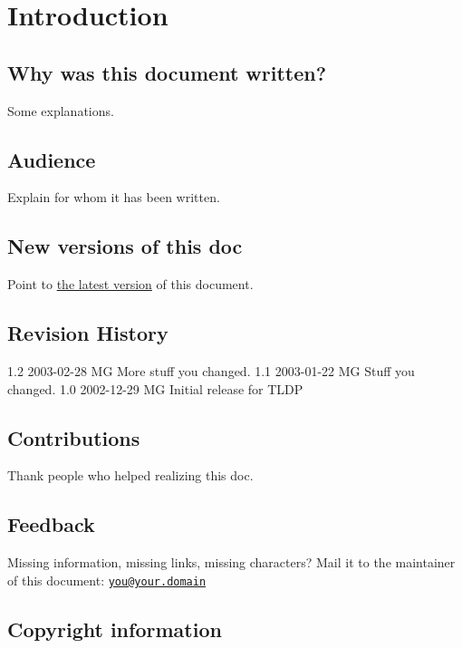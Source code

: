 \section{Introduction}

\subsection{Why was this document written?}\label{introux5f01}

Some explanations.

\subsection{Audience}\label{introux5f02}

Explain for whom it has been written.

\subsection{New versions of this doc}\label{introux5f03}

Point to \href{http://somewhere.org}{the latest version} of this
document.

\subsection{Revision History}\label{introux5f04}

1.2 2003-02-28 MG More stuff you changed. 1.1 2003-01-22 MG Stuff you
changed. 1.0 2002-12-29 MG Initial release for TLDP

\subsection{Contributions}\label{introux5f05}

Thank people who helped realizing this doc.

\subsection{Feedback}\label{introux5f06}

Missing information, missing links, missing characters? Mail it to the
maintainer of this document:
\href{mailto:you@your.domain}{\nolinkurl{you@your.domain}}

\subsection{Copyright information}\label{introux5f07}

